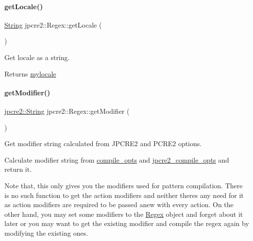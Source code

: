 \paragraph{\texorpdfstring{get\+Locale()}{getLocale()}}
{\footnotesize\ttfamily \hyperlink{namespacejpcre2_a91f03070152fb228bc116c5a737f1d16}{String} jpcre2\+::\+Regex\+::get\+Locale (\begin{DoxyParamCaption}{ }\end{DoxyParamCaption})\hspace{0.3cm}{\ttfamily [inline]}}



Get locale as a string. 

\begin{DoxyReturn}{Returns}
\hyperlink{classjpcre2_1_1Regex_a92a3ad992cade62d103248302f7e2f2d}{mylocale} 
\end{DoxyReturn}
\hypertarget{classjpcre2_1_1Regex_a0ac4e063f00128b96cd94c33609dc559_a0ac4e063f00128b96cd94c33609dc559}{}\label{classjpcre2_1_1Regex_a0ac4e063f00128b96cd94c33609dc559_a0ac4e063f00128b96cd94c33609dc559} 
\paragraph{\texorpdfstring{get\+Modifier()}{getModifier()}}
{\footnotesize\ttfamily \hyperlink{namespacejpcre2_a91f03070152fb228bc116c5a737f1d16}{jpcre2\+::\+String} jpcre2\+::\+Regex\+::get\+Modifier (\begin{DoxyParamCaption}{ }\end{DoxyParamCaption})}



Get modifier string calculated from J\+P\+C\+R\+E2 and P\+C\+R\+E2 options. 

Calculate modifier string from \hyperlink{classjpcre2_1_1Regex_a5954131e9085de63229ed5c11417df69}{compile\+\_\+opts} and \hyperlink{classjpcre2_1_1Regex_abdd26c3bc1c3132f0aa73dde1690a7ef}{jpcre2\+\_\+compile\+\_\+opts} and return it.

Note that, this only gives you the modifiers used for pattern compilation. There is no such function to get the action modifiers and neither there\textquotesingle{}s any need for it as action modifiers are required to be passed anew with every action. On the other hand, you may set some modifiers to the \hyperlink{classjpcre2_1_1Regex}{Regex} object and forget about it later or you may want to get the existing modifier and compile the regex again by modifying the existing ones.

